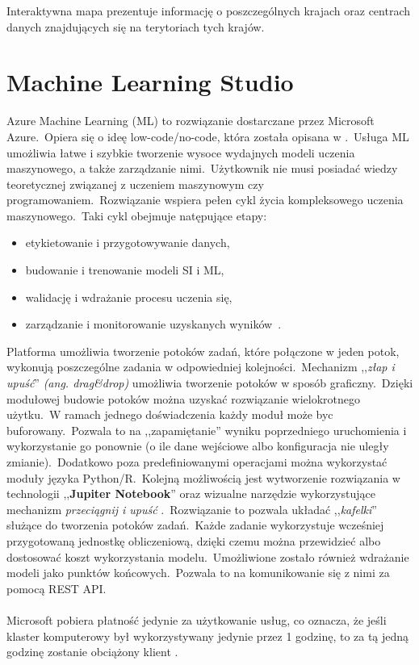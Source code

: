 Interaktywna mapa prezentuje informację o poszczególnych krajach oraz centrach danych znajdujących się na terytoriach tych krajów.

\section{Machine Learning Studio}
Azure Machine Learning (ML) to rozwiązanie dostarczane przez Microsoft Azure.\ Opiera się o ideę low-code/no-code, która została opisana w .\ Usługa ML umożliwia łatwe i szybkie tworzenie wysoce wydajnych modeli uczenia maszynowego, a także zarządzanie nimi.\ Użytkownik nie musi posiadać wiedzy teoretycznej związanej z uczeniem maszynowym czy programowaniem.\ Rozwiązanie wspiera pełen cykl życia kompleksowego uczenia maszynowego.\ Taki cykl obejmuje natępujące etapy:
\begin{itemize}
    \item etykietowanie i przygotowywanie danych,
    \item budowanie i trenowanie modeli SI i ML,
    \item walidację i wdrażanie procesu uczenia się,
    \item zarządzanie i monitorowanie uzyskanych wyników~\cite{MicrosoftAzure}.
\end{itemize}


Platforma umożliwia tworzenie potoków zadań, które połączone w jeden potok, wykonują poszczególne zadania w odpowiedniej kolejności.\ Mechanizm ,,\textit{złap i upuść}'' \textit{(ang. drag\&drop)} umożliwia tworzenie potoków w sposób graficzny.\ Dzięki modułowej budowie potoków można uzyskać rozwiązanie wielokrotnego użytku.\ W ramach jednego doświadczenia każdy moduł może byc buforowany.\ Pozwala to na ,,zapamiętanie'' wyniku poprzedniego uruchomienia i wykorzystanie go ponownie (o ile dane wejściowe albo konfiguracja nie uległy zmianie).\ Dodatkowo poza predefiniowanymi operacjami można wykorzystać moduły języka Python/R.\ Kolejną możliwością jest wytworzenie rozwiązania w technologii ,,\textbf{Jupiter Notebook}'' oraz wizualne narzędzie wykorzystujące mechanizm \textit{przeciągnij i upuść} .\ Rozwiązanie to pozwala układać ,,\textit{kafelki}'' służące do tworzenia potoków zadań.\ Każde zadanie wykorzystuje wcześniej przygotowaną jednostkę obliczeniową, dzięki czemu można przewidzieć albo dostosować koszt wykorzystania modelu.\ Umożliwione zostało również wdrażanie modeli jako punktów końcowych.\ Pozwala to na komunikowanie się z nimi za pomocą REST API.
\\ \\
Microsoft pobiera płatność jedynie za użytkowanie usług, co oznacza, że jeśli klaster komputerowy był wykorzystywany jedynie przez 1 godzinę, to za tą jedną godzinę zostanie obciążony klient \cite{MicrosoftAzuref}.